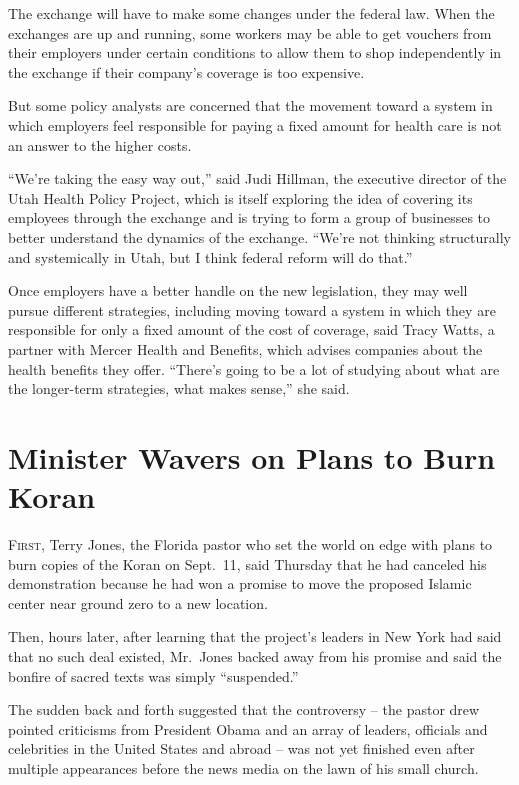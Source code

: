 ﻿\documentclass[12pt]{article}
\begin{document}
The exchange will have to make some changes under the federal law. When the exchanges are up and
running, some workers may be able to get vouchers from their employers under certain conditions to
allow them to shop independently in the exchange if their company's coverage is too expensive.

But some policy analysts are concerned that the movement toward a system in which employers feel
responsible for paying a fixed amount for health care is not an answer to the higher costs.

``We're taking the easy way out,'' said Judi Hillman, the executive director of the Utah Health
Policy Project, which is itself exploring the idea of covering its employees through the exchange
and is trying to form a group of businesses to better understand the dynamics of the exchange.
``We're not thinking structurally and systemically in Utah, but I think federal reform will do
that.''

Once employers have a better handle on the new legislation, they may well pursue different
strategies, including moving toward a system in which they are responsible for only a fixed amount
of the cost of coverage, said Tracy Watts, a partner with Mercer Health and Benefits, which advises
companies about the health benefits they offer. ``There's going to be a lot of studying about what
are the longer-term strategies, what makes sense,'' she said.

\pagebreak
\section{Minister Wavers on Plans to Burn Koran}

\lettrine{F}{irst}, Terry Jones, the Florida pastor who set the world on
edge with plans to burn copies of the Koran on Sept.~11, said Thursday that he had canceled his
demonstration because he had won a promise to move the proposed Islamic center near ground zero to a
new location.

Then, hours later, after learning that the project's leaders in New York had said that no such deal
existed, Mr.~Jones backed away from his promise and said the bonfire of sacred texts was simply
``suspended.''

The sudden back and forth suggested that the controversy -- the pastor drew pointed criticisms from
President Obama and an array of leaders, officials and celebrities in the United States and abroad
-- was not yet finished even after multiple appearances before the news media on the lawn of his
small church.
\end{document}

